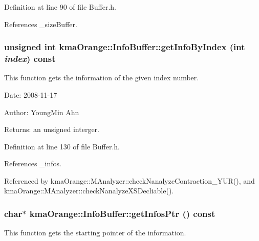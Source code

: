 Definition at line 90 of file Buffer.h.

References \_\-sizeBuffer.\hypertarget{classkmaOrange_1_1InfoBuffer_4065c2c4021fdd468e9d4a50fcabe671}{
\subsubsection[{getInfoByIndex}]{\setlength{\rightskip}{0pt plus 5cm}unsigned int kmaOrange::InfoBuffer::getInfoByIndex (int {\em index}) const}}
\label{classkmaOrange_1_1InfoBuffer_4065c2c4021fdd468e9d4a50fcabe671}


This function gets the information of the given index number. 

\begin{Desc}
\item[Date:]2008-11-17 \end{Desc}
\begin{Desc}
\item[Author:]YoungMin Ahn \end{Desc}
\begin{Desc}
\item[Returns:]an unsigned interger. \end{Desc}


Definition at line 130 of file Buffer.h.

References \_\-infos.

Referenced by kmaOrange::MAnalyzer::checkNanalyzeContraction\_\-YUR(), and kmaOrange::MAnalyzer::checkNanalyzeXSDecliable().\hypertarget{classkmaOrange_1_1InfoBuffer_acc36dd8a12545210bf5f53cb4ab77ed}{
\subsubsection[{getInfosPtr}]{\setlength{\rightskip}{0pt plus 5cm}char$\ast$ kmaOrange::InfoBuffer::getInfosPtr () const}}
\label{classkmaOrange_1_1InfoBuffer_acc36dd8a12545210bf5f53cb4ab77ed}


This function gets the starting pointer of the information. 

